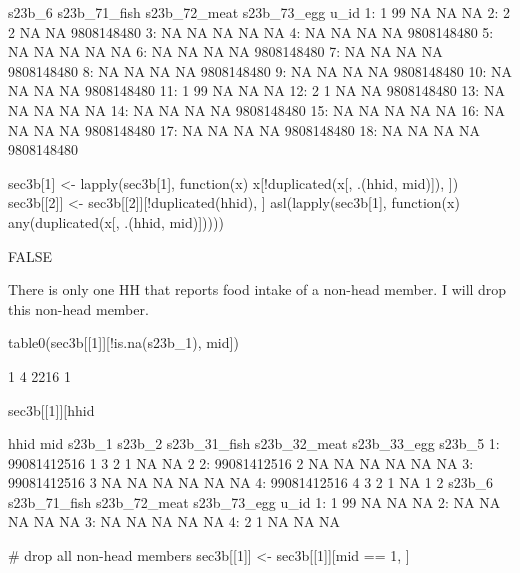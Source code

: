 \begin{Schunk}
\begin{Soutput}
    s23b_6 s23b_71_fish s23b_72_meat s23b_73_egg       u_id
 1:      1           99           NA          NA         NA
 2:      2            2           NA          NA 9808148480
 3:     NA           NA           NA          NA         NA
 4:     NA           NA           NA          NA 9808148480
 5:     NA           NA           NA          NA         NA
 6:     NA           NA           NA          NA 9808148480
 7:     NA           NA           NA          NA 9808148480
 8:     NA           NA           NA          NA 9808148480
 9:     NA           NA           NA          NA 9808148480
10:     NA           NA           NA          NA 9808148480
11:      1           99           NA          NA         NA
12:      2            1           NA          NA 9808148480
13:     NA           NA           NA          NA         NA
14:     NA           NA           NA          NA 9808148480
15:     NA           NA           NA          NA         NA
16:     NA           NA           NA          NA 9808148480
17:     NA           NA           NA          NA 9808148480
18:     NA           NA           NA          NA 9808148480
\end{Soutput}
\begin{Sinput}
sec3b[1] <- lapply(sec3b[1], 
	function(x) x[!duplicated(x[, .(hhid, mid)]), ])
sec3b[[2]] <- sec3b[[2]][!duplicated(hhid), ]
asl(lapply(sec3b[1], 
	function(x) any(duplicated(x[, .(hhid, mid)]))))
\end{Sinput}
\begin{Soutput}
[1] FALSE
\end{Soutput}
\end{Schunk}
There is only one HH that reports food intake of a non-head member. I will drop this non-head member.
\begin{Schunk}
\begin{Sinput}
table0(sec3b[[1]][!is.na(s23b_1), mid])
\end{Sinput}
\begin{Soutput}

   1    4 
2216    1 
\end{Soutput}
\begin{Sinput}
sec3b[[1]][hhid %in% hhid[!is.na(s23b_1) & mid != 1], ]
\end{Sinput}
\begin{Soutput}
          hhid mid s23b_1 s23b_2 s23b_31_fish s23b_32_meat s23b_33_egg s23b_5
1: 99081412516   1      3      2            1           NA          NA      2
2: 99081412516   2     NA     NA           NA           NA          NA     NA
3: 99081412516   3     NA     NA           NA           NA          NA     NA
4: 99081412516   4      3      2            1           NA           1      2
   s23b_6 s23b_71_fish s23b_72_meat s23b_73_egg u_id
1:      1           99           NA          NA   NA
2:     NA           NA           NA          NA   NA
3:     NA           NA           NA          NA   NA
4:      2            1           NA          NA   NA
\end{Soutput}
\begin{Sinput}
# drop all non-head members
sec3b[[1]] <- sec3b[[1]][mid == 1, ]
\end{Sinput}
\end{Schunk}
